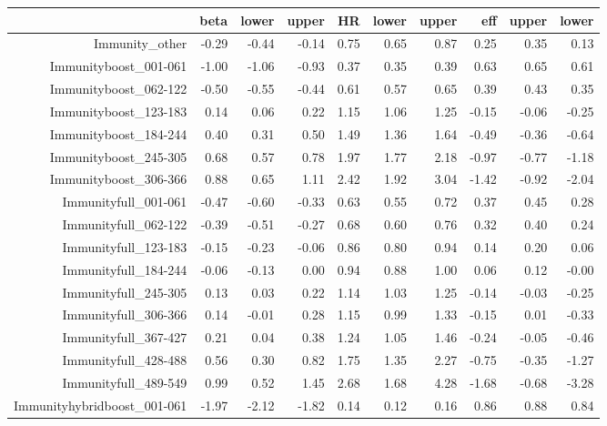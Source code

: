 \begin{table}[ht]
\centering
\begin{tabular}{rrrrrrrrrr}
  \hline
 & beta & lower & upper & HR & lower & upper & eff & upper & lower \\ 
  \hline
Immunity\_other & -0.29 & -0.44 & -0.14 & 0.75 & 0.65 & 0.87 & 0.25 & 0.35 & 0.13 \\ 
  Immunityboost\_001-061 & -1.00 & -1.06 & -0.93 & 0.37 & 0.35 & 0.39 & 0.63 & 0.65 & 0.61 \\ 
  Immunityboost\_062-122 & -0.50 & -0.55 & -0.44 & 0.61 & 0.57 & 0.65 & 0.39 & 0.43 & 0.35 \\ 
  Immunityboost\_123-183 & 0.14 & 0.06 & 0.22 & 1.15 & 1.06 & 1.25 & -0.15 & -0.06 & -0.25 \\ 
  Immunityboost\_184-244 & 0.40 & 0.31 & 0.50 & 1.49 & 1.36 & 1.64 & -0.49 & -0.36 & -0.64 \\ 
  Immunityboost\_245-305 & 0.68 & 0.57 & 0.78 & 1.97 & 1.77 & 2.18 & -0.97 & -0.77 & -1.18 \\ 
  Immunityboost\_306-366 & 0.88 & 0.65 & 1.11 & 2.42 & 1.92 & 3.04 & -1.42 & -0.92 & -2.04 \\ 
  Immunityfull\_001-061 & -0.47 & -0.60 & -0.33 & 0.63 & 0.55 & 0.72 & 0.37 & 0.45 & 0.28 \\ 
  Immunityfull\_062-122 & -0.39 & -0.51 & -0.27 & 0.68 & 0.60 & 0.76 & 0.32 & 0.40 & 0.24 \\ 
  Immunityfull\_123-183 & -0.15 & -0.23 & -0.06 & 0.86 & 0.80 & 0.94 & 0.14 & 0.20 & 0.06 \\ 
  Immunityfull\_184-244 & -0.06 & -0.13 & 0.00 & 0.94 & 0.88 & 1.00 & 0.06 & 0.12 & -0.00 \\ 
  Immunityfull\_245-305 & 0.13 & 0.03 & 0.22 & 1.14 & 1.03 & 1.25 & -0.14 & -0.03 & -0.25 \\ 
  Immunityfull\_306-366 & 0.14 & -0.01 & 0.28 & 1.15 & 0.99 & 1.33 & -0.15 & 0.01 & -0.33 \\ 
  Immunityfull\_367-427 & 0.21 & 0.04 & 0.38 & 1.24 & 1.05 & 1.46 & -0.24 & -0.05 & -0.46 \\ 
  Immunityfull\_428-488 & 0.56 & 0.30 & 0.82 & 1.75 & 1.35 & 2.27 & -0.75 & -0.35 & -1.27 \\ 
  Immunityfull\_489-549 & 0.99 & 0.52 & 1.45 & 2.68 & 1.68 & 4.28 & -1.68 & -0.68 & -3.28 \\ 
  Immunityhybridboost\_001-061 & -1.97 & -2.12 & -1.82 & 0.14 & 0.12 & 0.16 & 0.86 & 0.88 & 0.84 \\ 

\end{tabular}
\end{table}
